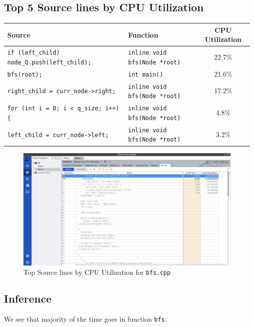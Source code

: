 \documentclass[11pt, swedish, openany]{book}
\begin{document}
\subsection*{Top 5 Source lines by CPU Utilization}
\begin{table}[H]
    \begin{tabular}{||l|l||c||}
        \hline
        Source                                               & Function                             & CPU Utilization \\
        \hline
        \texttt{if (left\_child) node\_Q.push(left\_child);} & \texttt{inline void bfs(Node *root)} & 22.7\%          \\
        \texttt{bfs(root);}                                  & \texttt{int main()}                  & 21.6\%          \\
        \texttt{right\_child = curr\_node->right;}           & \texttt{inline void bfs(Node *root)} & 17.2\%          \\
        \texttt{for (int i = 0; i < q\_size; i++) \{}        & \texttt{inline void bfs(Node *root)} & 4.8\%           \\
        \texttt{left\_child = curr\_node->left;}             & \texttt{inline void bfs(Node *root)} & 3.2\%           \\
        \hline
    \end{tabular}
\end{table}

\begin{figure}[H]
    \centering
    \includegraphics[scale=0.25]{vtune/bfs/sc.png}
    \caption{Top Source lines by CPU Utilization for \texttt{bfs.cpp}}
\end{figure}

\subsection*{Inference}
We see that majority of the time goes in function \texttt{bfs}.
\end{document}
